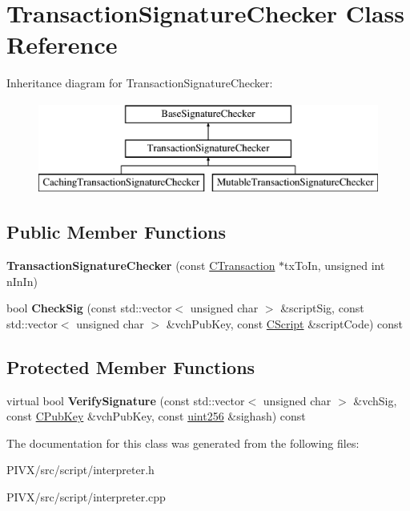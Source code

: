 \hypertarget{class_transaction_signature_checker}{}\section{Transaction\+Signature\+Checker Class Reference}
\label{class_transaction_signature_checker}
Inheritance diagram for Transaction\+Signature\+Checker\+:\begin{figure}[H]
\begin{center}
\leavevmode
\includegraphics[height=3.000000cm]{class_transaction_signature_checker}
\end{center}
\end{figure}
\subsection*{Public Member Functions}
\begin{DoxyCompactItemize}
\item 
\mbox{\label{class_transaction_signature_checker_ab1e6927dad48bb5ae8109acdb39eaf56}} 
{\bfseries Transaction\+Signature\+Checker} (const \mbox{\hyperlink{class_c_transaction}{C\+Transaction}} $\ast$tx\+To\+In, unsigned int n\+In\+In)
\item 
\mbox{\label{class_transaction_signature_checker_a4c1b0660671ef71492259d2a522140dc}} 
bool {\bfseries Check\+Sig} (const std\+::vector$<$ unsigned char $>$ \&script\+Sig, const std\+::vector$<$ unsigned char $>$ \&vch\+Pub\+Key, const \mbox{\hyperlink{class_c_script}{C\+Script}} \&script\+Code) const
\end{DoxyCompactItemize}
\subsection*{Protected Member Functions}
\begin{DoxyCompactItemize}
\item 
\mbox{\label{class_transaction_signature_checker_a8691f10179573b1421defe3843c04c96}} 
virtual bool {\bfseries Verify\+Signature} (const std\+::vector$<$ unsigned char $>$ \&vch\+Sig, const \mbox{\hyperlink{class_c_pub_key}{C\+Pub\+Key}} \&vch\+Pub\+Key, const \mbox{\hyperlink{classuint256}{uint256}} \&sighash) const
\end{DoxyCompactItemize}


The documentation for this class was generated from the following files\+:\begin{DoxyCompactItemize}
\item 
P\+I\+V\+X/src/script/interpreter.\+h\item 
P\+I\+V\+X/src/script/interpreter.\+cpp\end{DoxyCompactItemize}
